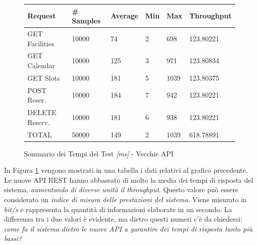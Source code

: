 \begin{figure}[H]
    \begin{table}[H]
        \centering
        \begin{tabular}{ |p{3cm}||p{2cm}|p{2cm}|p{1cm}|p{1cm}|p{2cm}| }
            \hline
            Request & \# Samples & Average  & Min & Max &  Throughput\\
            \hline
            GET Facilities      & 10000    & 74   & 2 & 698 & 123.80221      \\
            GET Calendar        & 10000    & 125   & 3 & 971        & 123.80834      \\
            GET Slots        & 10000    & 181   & 5 & 1039        & 123.80375      \\
            POST Reser.        & 10000    & 184    & 7 & 942        & 123.80221      \\
            DELETE Reserv.        & 10000    & 181    & 6 & 938        & 123.80221      \\
            TOTAL        & 50000    & 149    & 2 & 1039        & 618.78891      \\
            \hline
        \end{tabular}
    \end{table}
    \caption{Sommario dei Tempi del Test \textit{[ms]} - Vecchie API}
    \label{fig:newapi100t_summary}
\end{figure}
In Figura \ref{fig:newapi100t_summary} vengono mostrati in una tabella i dati relativi al grafico precedente. Le nuove API REST hanno abbassato di molto la media dei tempi di risposta del sistema, \emph{aumentando di diverse unità il throughput}. Questo valore può essere considerato un \emph{indice di misura delle prestazioni del sistema}. Viene misurato in \emph{bit/s} e rappresenta la quantità di informazioni elaborate in un secondo. La differenza tra i due valori è evidente, ma dietro questi numeri c'è da chiedersi: \emph{come fa il sistema dietro le nuove API a garantire dei tempi di risposta tanto più bassi?}

